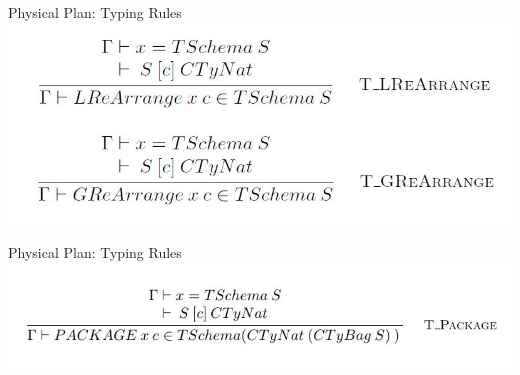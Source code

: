 \begin{frame}{Physical Plan: Typing Rules}
\centering
\includegraphics[scale=0.4]{Images/TypingRules/ReArrange.JPG}
\end{frame}

\begin{frame}{Physical Plan: Typing Rules}
\centering
\includegraphics[scale=0.4]{Images/TypingRules/Package.JPG}
\end{frame}


